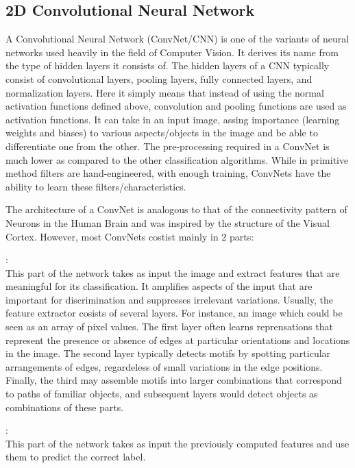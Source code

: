 \subsection {2D Convolutional Neural Network}
A Convolutional Neural Network (ConvNet/CNN) is one of the variants of neural networks used heavily in the field of Computer Vision. It
derives its name from the type of hidden layers it consists of. The hidden layers of a CNN typically consist of convolutional layers, pooling
layers, fully connected layers, and normalization layers. Here it simply means that instead of using the normal activation functions defined
above, convolution and pooling functions are used as activation functions.
It can take in an input image, assing importance (learning weights and biases) to various aspects/objects in the image and be able to
differentiate one from the other. The pre-processing required in a ConvNet is much lower as compared to the other classification algorithms.
While in primitive method filters are hand-engineered, with enough training, ConvNets have the ability to learn these filters/characteristics.

The architecture of a ConvNet is analogous to that of the connectivity pattern of Neurons in the Human Brain and was inspired by the
structure of the Visual Cortex. However, most ConvNets costist mainly in 2 parts:
\begin{description}[font=$\bullet$\scshape\bfseries]
\item [ Feature extractor] : \\
  This part of the network takes as input the image and extract features that are meaningful for its classification. It amplifies aspects
  of the input that are important for discrimination and suppresses irrelevant variations. Usually, the feature extractor cosists of
  several layers. For instance, an image which could be seen as an array of pixel values. The first layer often learns reprensations
  that represent the presence or absence of edges at particular orientations and locations in the image. The second layer typically
  detects motifs by spotting particular arrangements of edges, regardeless of small variations in the edge positions. Finally, the third
  may assemble motifs into larger combinations that correspond to paths of familiar objects, and subsequent layers would detect objects
  as combinations of these parts.
  
\item [ Classifier ] : \\
  This part of the network takes as input the previously computed features and use them to predict the correct label.
\end{description}


